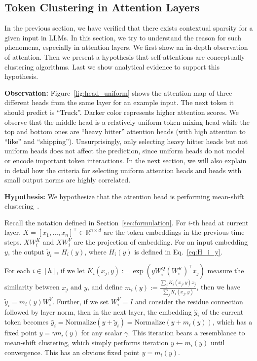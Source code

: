 \subsection{Token Clustering in Attention Layers}
\label{sec:obs_att_cluster}

In the previous section, we have verified that there exists contextual sparsity for a given input in LLMs. In this section, we try to understand the reason for such phenomena, especially in attention layers. We first show an in-depth observation of attention. Then we present a hypothesis that self-attentions are conceptually clustering algorithms. Last we show analytical evidence to support this hypothesis. 


\textbf{Observation:} Figure~\ref{fig:head_uniform} shows the attention map of three different heads from the same layer for an example input. The next token it should predict is ``Truck''. Darker color represents higher attention scores. We observe that the middle head is a relatively uniform token-mixing head while the top and bottom ones are ``heavy hitter'' attention heads (with high attention to ``like'' and ``shipping''). Unsurprisingly, only selecting heavy hitter heads but not uniform heads does not affect the prediction, since uniform heads do not model or encode important token interactions. In the next section, we will also explain in detail how the criteria for selecting uniform attention heads and heads with small output norms are highly correlated.    

\def\vone{\mathbf{1}}

\textbf{Hypothesis:} We hypothesize that the attention head is performing mean-shift clustering~\cite{derpanis2005mean}. 

Recall the notation defined in Section~\ref{sec:formulation}. For $i$-th head at current layer, $X = [x_1, \ldots, x_n]^{\top} \in \mathbb{R}^{n\times d}$ are the token embeddings in the previous time steps. $X W_i^K $ and $X W_i^V $ are the projection of embedding. For an input embedding $y$, the output $\tilde y_i = H_i(y)$, where $H_i(y)$ is defined in Eq.~\ref{eq:H_i_y}. 

\def\vm{\mathbf{m}}
For each $i \in [h]$, if we let $K_i(x_j,y) := \exp(y W_i^Q(W_i^K)^\top x_j)$ measure the similarity between $x_j$ and $y$, and define $m_i(y) := \frac{\sum_j K_i(x_j,y) x_j}{\sum_j K_i(x_j,y)}$, then we have $\tilde y_i =  m_i(y) W_i^V$. Further, if we set $W^V_i=I$ and consider the residue connection followed by layer norm, then in the next layer, the embedding $\hat y_i$ of the current token becomes $\hat y_i = \mathrm{Normalize}(y + \tilde y_i) = \mathrm{Normalize}(y + m_i(y))$, which has a fixed point $y = \gamma m_i(y)$ for any scalar $\gamma$. This iteration bears a resemblance to mean-shift clustering, which simply performs iteration $y \leftarrow m_i(y)$ until convergence. This has an obvious fixed point $y = m_i(y)$. 

